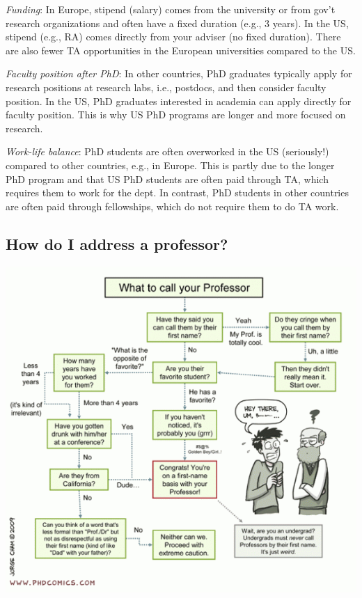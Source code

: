 \documentclass[11pt]{article}
\begin{document}
\emph{Funding}:  In Europe, stipend (salary) comes from the university or from gov't research organizations and often have a fixed duration (e.g., 3 years).  In the US, stipend (e.g., RA) comes directly from your adviser (no fixed duration).  There are also fewer TA opportunities in the European universities compared to the US.

\emph{Faculty position after PhD}: In other countries, PhD graduates typically apply for research positions at research labs, i.e., postdocs, and then consider faculty position. In the US, PhD graduates interested in academia can apply directly for faculty position.  This is why US PhD programs are longer and more focused on research.

\emph{Work-life balance}: PhD students are often overworked in the US (seriously!) compared to other countries, e.g., in Europe.  This is partly due to the longer PhD program and that US PhD students are often paid through TA, which requires them to work for the dept. In contrast, PhD students in other countries are often paid through fellowships, which do not require them to do TA work.

\subsection{How do I address a professor?}\label{sec:address}

      \begin{center}
        \includegraphics[scale=0.7]{c5.png}
      \end{center}
\end{document}

